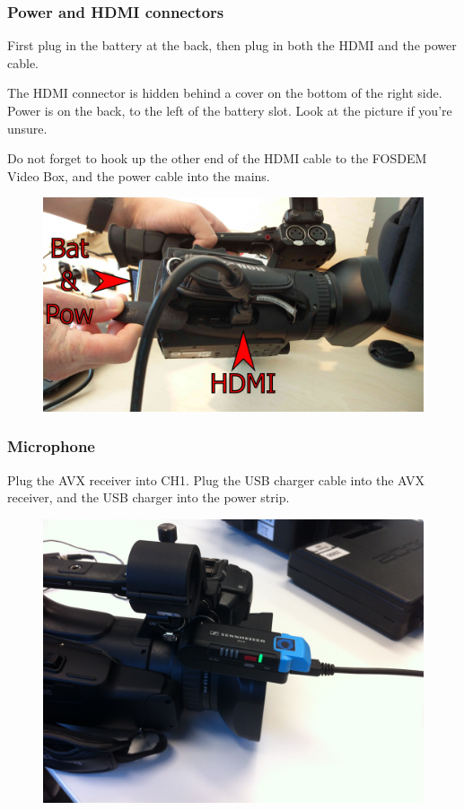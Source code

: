 \documentclass{article}
\begin{document}
\subsubsection{Power and HDMI connectors}
First plug in the battery at the back, then plug in both the HDMI and the power cable.

The HDMI connector is hidden behind a cover on the bottom of the right side.
Power is on the back, to the left of the battery slot.
Look at the picture if you're unsure.

Do not forget to hook up the other end of the HDMI cable to the FOSDEM Video Box, and the power cable into the mains.

\begin{figure}[H]
  \centering
\includegraphics[width = 120mm]{Canon01.jpg}
\end{figure}

\subsubsection{Microphone}
Plug the AVX receiver into CH1. Plug the USB charger cable into the AVX receiver, and the USB charger into the power strip.

\begin{figure}[H]
  \centering
\includegraphics[width = 120mm]{canon_avx_receiver.jpg}
\end{figure}
\end{document}
